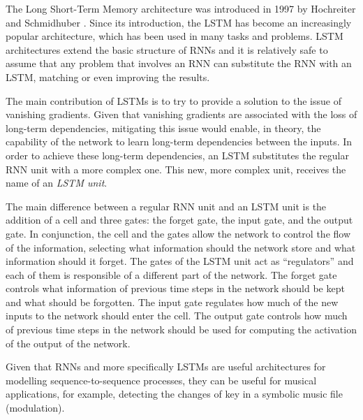 The Long Short-Term Memory architecture was introduced in
1997 by Hochreiter and Schmidhuber
\parencite{hochreiter1997long}. Since its introduction, the
LSTM has become an increasingly popular architecture, which
has been used in many tasks and problems. LSTM architectures
extend the basic structure of RNNs and it is relatively safe
to assume that any problem that involves an RNN can
substitute the RNN with an LSTM, matching or even improving
the results.

The main contribution of LSTMs is to try to provide a
solution to the issue of vanishing gradients. Given that
vanishing gradients are associated with the loss of
long-term dependencies, mitigating this issue would enable,
in theory, the capability of the network to learn long-term
dependencies between the inputs. In order to achieve these
long-term dependencies, an LSTM substitutes the regular RNN
unit with a more complex one. This new, more complex unit,
receives the name of an \emph{LSTM unit}.

The main difference between a regular RNN unit and an LSTM
unit is the addition of a cell and three gates: the forget
gate, the input gate, and the output gate. In conjunction,
the cell and the gates allow the network to control the flow
of the information, selecting what information should the
network store and what information should it forget. The
gates of the LSTM unit act as ``regulators'' and each of
them is responsible of a different part of the network. The
forget gate controls what information of previous time steps
in the network should be kept and what should be forgotten.
The input gate regulates how much of the new inputs to the
network should enter the cell. The output gate controls how
much of previous time steps in the network should be used
for computing the activation of the output of the network.

Given that RNNs and more specifically LSTMs are useful
architectures for modelling sequence-to-sequence processes,
they can be useful for musical applications, for example,
detecting the changes of key in a symbolic music file
(modulation).



